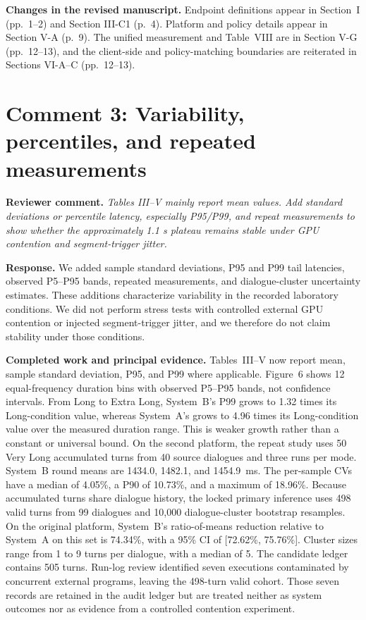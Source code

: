 \documentclass[11pt]{article}
\newcommand{\reviewcomment}[1]{\vspace{0.4em}\noindent\textbf{Reviewer comment.} \emph{#1}}
\newcommand{\response}{\vspace{0.25em}\noindent\textbf{Response.} }
\newcommand{\completed}{\vspace{0.25em}\noindent\textbf{Completed work and principal evidence.} }
\newcommand{\changes}{\vspace{0.25em}\noindent\textbf{Changes in the revised manuscript.} }
\begin{document}
\changes Endpoint definitions appear in Section~I (pp.~1--2) and Section III-C1 (p.~4). Platform and policy details appear in Section V-A (p.~9). The unified measurement and Table~VIII are in Section V-G (pp.~12--13), and the client-side and policy-matching boundaries are reiterated in Sections VI-A--C (pp.~12--13).

\section*{Comment 3: Variability, percentiles, and repeated measurements}

\reviewcomment{Tables III--V mainly report mean values. Add standard deviations or percentile latency, especially P95/P99, and repeat measurements to show whether the approximately 1.1 s plateau remains stable under GPU contention and segment-trigger jitter.}

\response We added sample standard deviations, P95 and P99 tail latencies, observed P5--P95 bands, repeated measurements, and dialogue-cluster uncertainty estimates. These additions characterize variability in the recorded laboratory conditions. We did not perform stress tests with controlled external GPU contention or injected segment-trigger jitter, and we therefore do not claim stability under those conditions.

\completed Tables~III--V now report mean, sample standard deviation, P95, and P99 where applicable. Figure~6 shows 12 equal-frequency duration bins with observed P5--P95 bands, not confidence intervals. From Long to Extra Long, System~B's P99 grows to 1.32 times its Long-condition value, whereas System~A's grows to 4.96 times its Long-condition value over the measured duration range. This is weaker growth rather than a constant or universal bound. On the second platform, the repeat study uses 50 Very Long accumulated turns from 40 source dialogues and three runs per mode. System~B round means are 1434.0, 1482.1, and 1454.9~ms. The per-sample CVs have a median of 4.05\%, a P90 of 10.73\%, and a maximum of 18.96\%. Because accumulated turns share dialogue history, the locked primary inference uses 498 valid turns from 99 dialogues and 10,000 dialogue-cluster bootstrap resamples. On the original platform, System~B's ratio-of-means reduction relative to System~A on this set is 74.34\%, with a 95\% CI of [72.62\%, 75.76\%]. Cluster sizes range from 1 to 9 turns per dialogue, with a median of 5. The candidate ledger contains 505 turns. Run-log review identified seven executions contaminated by concurrent external programs, leaving the 498-turn valid cohort. Those seven records are retained in the audit ledger but are treated neither as system outcomes nor as evidence from a controlled contention experiment.
\end{document}
